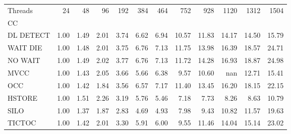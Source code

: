 \begin{tabular}{lrrrrrrrrrrr}
\toprule
Threads &  24   &  48   &  96   &  192  &  384  &  464  &  752  &  928  &  1120 &  1312 &  1504 \\
CC        &       &       &       &       &       &       &       &       &       &       &       \\
\midrule
DL DETECT &  1.00 &  1.49 &  2.01 &  3.74 &  6.62 &  6.94 & 10.57 & 11.83 & 14.17 & 14.50 & 15.79 \\
WAIT DIE  &  1.00 &  1.48 &  2.01 &  3.75 &  6.76 &  7.13 & 11.75 & 13.98 & 16.39 & 18.57 & 24.71 \\
NO WAIT   &  1.00 &  1.49 &  2.02 &  3.77 &  6.76 &  7.13 & 11.72 & 14.28 & 16.93 & 18.87 & 24.98 \\
MVCC      &  1.00 &  1.43 &  2.05 &  3.66 &  5.66 &  6.38 &  9.57 & 10.60 &   nan & 12.71 & 15.41 \\
OCC       &  1.00 &  1.42 &  1.84 &  3.56 &  6.57 &  7.17 & 11.40 & 13.45 & 16.20 & 18.15 & 22.15 \\
HSTORE    &  1.00 &  1.51 &  2.26 &  3.19 &  5.76 &  5.46 &  7.18 &  7.73 &  8.26 &  8.63 & 10.79 \\
SILO      &  1.00 &  1.37 &  1.87 &  2.83 &  4.69 &  4.93 &  7.98 &  9.43 & 10.82 & 11.57 & 19.63 \\
TICTOC    &  1.00 &  1.42 &  2.01 &  3.30 &  5.91 &  6.00 &  9.55 & 11.46 & 14.04 & 15.14 & 23.02 \\
\bottomrule
\end{tabular}
